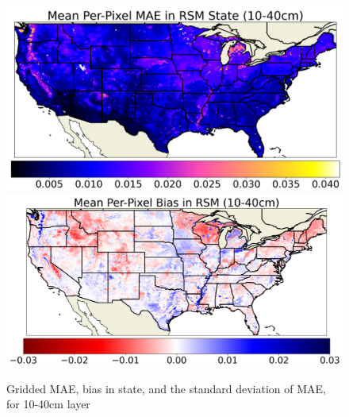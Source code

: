 \begin{figure}[hp!]
    \centering

    \includegraphics[width=.48\linewidth,draft=false]{figures/grid-eval_lstm-rsm-9_full/eval-grid_full_lstm-rsm-9_rsm-40_spatial-stats_abs-err_state-err-abs-mean.png}
    \includegraphics[width=.48\linewidth,draft=false]{figures/grid-eval_lstm-rsm-9_full/eval-grid_full_lstm-rsm-9_rsm-40_spatial-stats_bias_state-err-bias-mean.png}


    \caption{Gridded MAE, bias in state, and the standard deviation of MAE, for 10-40cm layer}
    \label{lstm-rsm-9-grid-rsm-40}
\end{figure}


